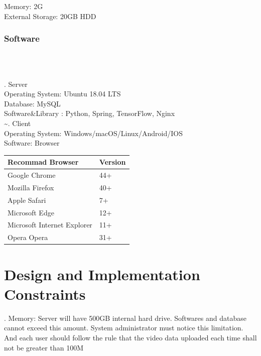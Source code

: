 \documentclass[16pt]{scrreprt}
\begin{document}
Memory: 2G\\

External Storage: 20GB HDD\\


\subsubsection{Software}

\\~

. Server\\

Operating System: Ubuntu 18.04 LTS\\

Database: MySQL\\

Software&Library : Python, Spring, TensorFlow, Nginx\\

\~

. Client\\

Operating System: Windows/macOS/Linux/Android/IOS\\

Software: Browser\\


\begin{center}
    \begin{tabular}{p{7cm}p{7cm}}
        \hline
	    Recommad Browser & Version\\
        \hline
	    Google Chrome &  44+\\
        \hline
	    Mozilla Firefox & 40+\\
        \hline
        Apple Safari & 7+\\
        \hline
        Microsoft Edge & 12+\\
        \hline
        Microsoft Internet Explorer & 11+\\
        \hline
        Opera Opera & 31+\\
        \hline

    \end{tabular}
\end{center}

\section{Design and Implementation Constraints}

. Memory: Server will have 500GB internal hard drive. Softwares and database cannot exceed this amount. System administrator must notice this limitation. And each user should follow the rule that the video data uploaded each time shall not be greater than 100M\\
\end{document}
